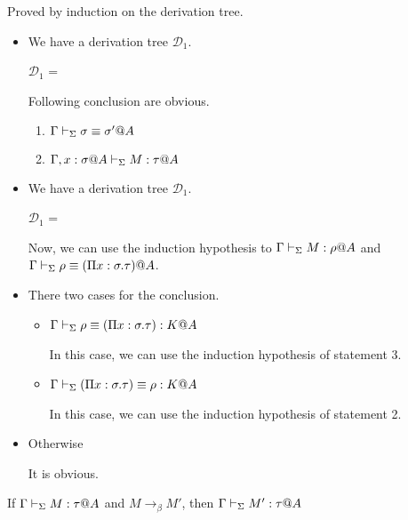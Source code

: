 Proved by induction on the derivation tree.

\begin{itemize}
	\item \TAbs

	      We have a derivation tree $\mathcal{D}_1$.

	      $\mathcal{D}_1$ = 
	      { \andalso {}}

	      Following conclusion are obvious.
	      \begin{enumerate}
		      \item $\Gamma \vdash_\Sigma \sigma \equiv \sigma'@A$
		      \item $\G ,x:\sigma@A\V M:\tau@A$
	      \end{enumerate}

	\item \TConv

	      We have a derivation tree $\mathcal{D}_1$.

	      $\mathcal{D}_1$ = 
	      { \andalso {}}

	      Now, we can use the induction hypothesis to $\G \V M : \rho@A$ and $\Gamma \vdash_\Sigma \rho \equiv (\Pi x:\sigma.\tau)@A$.

	\item \QTRefl

	      There two cases for the conclusion.
	      \begin{itemize}
		      \item $\Gamma \vdash_\Sigma \rho \equiv (\Pi x:\sigma.\tau) : K @A$

		            In this case, we can use the induction hypothesis of statement 3.
		      \item $\Gamma \vdash_\Sigma (\Pi x:\sigma.\tau) \equiv \rho : K @A$

		            In this case, we can use the induction hypothesis of statement 2.
	      \end{itemize}

	\item Otherwise

	      It is obvious.

\end{itemize}

\begin{theorem}
  If $\G\V M:\tau@A$ and $M \longrightarrow_{\beta} M'$, then $\G\V M':\tau@A$\\
\end{theorem}

